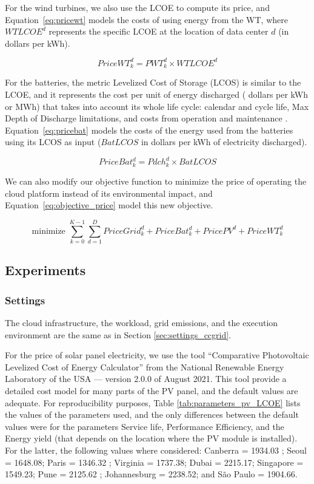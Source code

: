 For the wind turbines, we also use the LCOE to compute its price, and Equation~\eqref{eq:pricewt} models the costs of using energy from the WT, where $WTLCOE^d$ represents the specific LCOE at the location of data center $d$ (in dollars per kWh).


\begin{equation} \label{eq:pricewt}
  PriceWT^d_k = PWT^d_k \times WTLCOE^d
\end{equation}

For the batteries, the metric Levelized Cost of Storage (LCOS) is similar to the LCOE, and it represents the cost per unit of energy discharged ( dollars per kWh or MWh) that takes into account its whole life cycle: calendar and cycle life, Max Depth of Discharge limitations, and costs from operation and maintenance \cite{battery_lcos_2022}.  Equation~\eqref{eq:pricebat} models the costs of the energy used from the batteries using its LCOS as input ($BatLCOS$ in dollars per kWh of electricity discharged).

\begin{equation} \label{eq:pricebat}
   PriceBat^d_k = Pdch^d_k \times BatLCOS
\end{equation}



We can also modify our objective function to minimize the price of operating the cloud platform instead of its environmental impact, and Equation~\eqref{eq:objective_price} model this new objective.

\begin{equation} \label{eq:objective_price}
\text{minimize }\sum_{k=0}^{K-1} \sum_{d=1}^D PriceGrid^d_k  + PriceBat^d_k + PricePV^d+ PriceWT^d_k
\end{equation}


\subsection{Experiments}

\subsubsection{Settings}

The cloud infrastructure, the workload, grid emissions, and the execution environment are the same as in Section  \ref{sec:settings_ccgrid}.

For the price of solar panel electricity, we use the tool ``Comparative Photovoltaic Levelized Cost of Energy Calculator'' from the National Renewable Energy Laboratory of the USA \cite{pv_lcoe_calc} --- version 2.0.0 of August 2021. This tool provide a detailed cost model for many parts of the PV panel, and the default values are adequate. For reproducibility purposes, Table \ref{tab:parameters_pv_LCOE} lists the values of the parameters used, and the only differences between the default values were for the parameters Service life, Performance Efficiency, and the Energy yield (that depends on the location where the PV module is installed). For the latter, the following values where considered: Canberra = 1934.03 ; Seoul  = 1648.08; Paris = 1346.32 ; Virginia = 1737.38; Dubai =  2215.17; Singapore = 1549.23; Pune =  2125.62 ; Johannesburg = 2238.52; and São Paulo =  1904.66.

